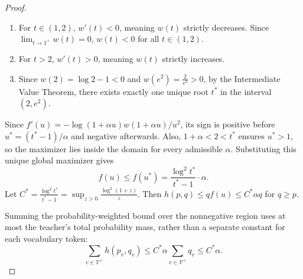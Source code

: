 \documentclass{article}
\theoremstyle{plain}
\theoremstyle{definition}
\theoremstyle{remark}
\begin{document}
\begin{proof}
\begin{enumerate}
		\item For $t \in (1, 2)$, $w'(t) < 0$, meaning $w(t)$ strictly decreases. Since $\lim_{t \to 1^+} w(t) = 0$, $w(t) < 0$ for all $t \in (1, 2)$.
		\item For $t > 2$, $w'(t) > 0$, meaning $w(t)$ strictly increases.
		\item Since $w(2)=\log2-1 < 0$ and $w(e^2)=\frac{2}{e^2}>0$, by the Intermediate Value Theorem, there exists exactly one unique root $t^*$ in the interval $(2, e^2)$.
	\end{enumerate}
	Since $f'(u)=-\log(1+\alpha u)w(1+\alpha u)/u^2$, its sign is positive before $u^*=(t^*-1)/\alpha$ and negative afterwards. Also, $1+\alpha<2<t^*$ ensures $u^*>1$, so the maximizer lies inside the domain for every admissible $\alpha$. Substituting this unique global maximizer gives
	\begin{equation}
		f(u)\leq f(u^*)=\frac{\log^2 t^*}{t^* - 1}\cdot\alpha.
	\end{equation}
	Let $C^*=\frac{\log^2 t^*}{t^*-1}=\sup_{z>0}\frac{\log^2(1+z)}{z}$. Then $h(p,q)\leq qf(u)\leq C^*\alpha q$ for $q\geq p$.
	
	Summing the probability-weighted bound over the nonnegative region uses at most the teacher's total probability mass, rather than a separate constant for each vocabulary token:
	\begin{equation}
		\sum_{v\in\mathcal{V}^+}h(p_v,q_v)\leq C^*\alpha\sum_{v\in\mathcal{V}^+}q_v\leq C^*\alpha.
	\end{equation}
	

\end{proof}
\end{document}
